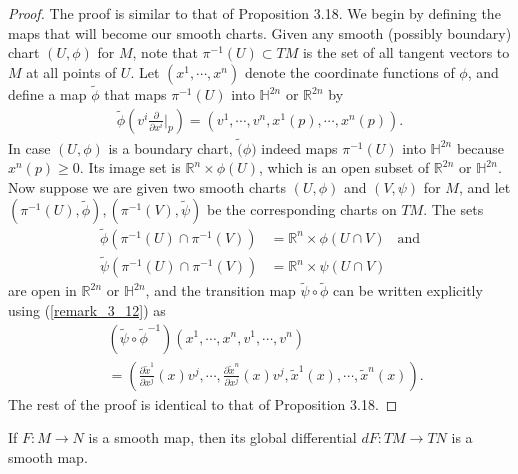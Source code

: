 \begin{proof}
  The proof is similar to that of Proposition 3.18.
  We begin by defining the maps that will become our smooth charts.
  Given any smooth (possibly boundary) chart $(U, \phi)$ for $M$, note that $\pi^{-1}(U) \subset TM$ is the set of all tangent vectors to $M$ at all points of $U$.
  Let $(x^1, \cdots, x^n)$ denote the coordinate functions of $\phi$, and define a map $\tilde{\phi}$ that maps $\pi^{-1}(U)$ into $\mathbb{H}^{2n}$ or $\mathbb{R}^{2n}$ by
  \begin{align*}
    \tilde{\phi}(v^i\frac{\partial}{\partial x^i}\Big\vert_p) = (v^1, \cdots, v^n, x^1(p), \cdots, x^n(p)).
  \end{align*}
  In case $(U, \phi)$ is a boundary chart, $\tilde(\phi)$ indeed maps $\pi^{-1}(U)$ into $\mathbb{H}^{2n}$ because $x^n(p) \geq 0$.
  Its image set is $\mathbb{R}^n \times \phi(U)$, which is an open subset of $\mathbb{R}^{2n}$ or $\mathbb{H}^{2n}$.
  Now suppose we are given two smooth charts $(U, \phi)$ and $(V, \psi)$ for $M$, and let $(\pi^{-1}(U), \tilde{\phi}), (\pi^{-1}(V), \tilde{\psi})$ be the corresponding charts on $TM$. The sets
  \begin{align*}
    \tilde{\phi}(\pi^{-1}(U) \cap \pi^{-1}(V)) &= \mathbb{R}^n \times \phi(U \cap V) & \text{and}\\
    \tilde{\psi}(\pi^{-1}(U) \cap \pi^{-1}(V)) &= \mathbb{R}^n \times \psi(U \cap V)
  \end{align*}
  are open in $\mathbb{R}^{2n}$ or $\mathbb{H}^{2n}$, and the transition map $\tilde{\psi} \circ \tilde{\phi}$ can be written explicitly using (\ref{remark_3_12}) as
  \begin{align*}
    &(\tilde{\psi} \circ \tilde{\phi}^{-1})(x^1, \cdots, x^n, v^1, \cdots, v^n) \\
      &= (\frac{\partial \tilde{x}^1}{\partial x^j}(x)v^j, \cdots, \frac{\partial \tilde{x}^n}{\partial x^j}(x)v^j, \tilde{x}^1(x), \cdots, \tilde{x}^n(x)).
  \end{align*}
  The rest of the proof is identical to that of Proposition 3.18.
\end{proof}

\begin{customthm}{3.21}
  If $F: M \rightarrow N$ is a smooth map, then its global differential $dF: TM \rightarrow TN$ is a smooth map.
\end{customthm}

